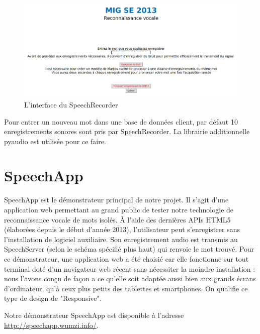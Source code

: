 \documentclass[a4paper,12pt]{report}
\begin{document}
\begin{figure}[H]
	\begin{center}
	\includegraphics[width=14cm]{pics/speechrecorder-record.png} 
	\end{center}
	\caption{L'interface du SpeechRecorder}
\end{figure}

Pour entrer un nouveau mot dans une base de données client, par défaut 10 enregistrements sonores sont pris par SpeechRecorder. La librairie additionnelle pyaudio est utilisée pour ce faire.


\section{SpeechApp}

SpeechApp est le démonstrateur principal de notre projet.
Il s'agit d'une application web permettant au grand public de tester notre technologie de reconnaissance vocale de mots isolés.
À l'aide des dernières APIs HTML5 (élaborées depuis le début d'année 2013), l'utilisateur peut s'enregistrer sans l'installation de logiciel auxiliaire. Son enregistrement audio est transmis au SpeechServer (selon le schéma spécifié plus haut) qui renvoie le mot trouvé.
\medskip{}
Pour ce démonstrateur, une application web a été choisié car elle fonctionne sur tout terminal doté d'un navigateur web récent sans nécessiter la moindre installation : nous l'avons conçu de façon a ce qu'elle soit adaptée aussi bien aux grands écrans d'ordinateur, qu'à ceux plus petits des tablettes et smartphones. On qualifie ce type de design de "Responsive".

\bigskip{}

Notre démonstrateur SpeechApp est disponible à l'adresse \url{http://speechapp.wumzi.info/}.
\end{document}
